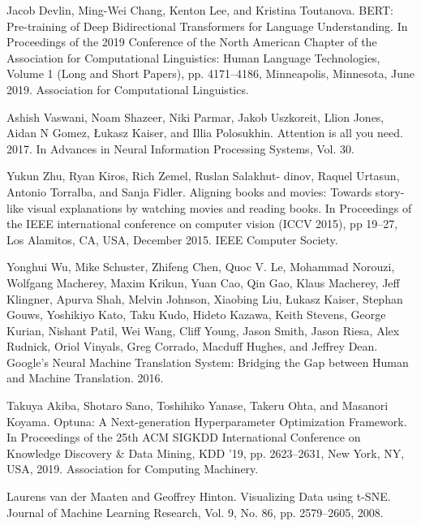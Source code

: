 \begin{thebibliography}{99}
Jacob Devlin, Ming-Wei Chang, Kenton Lee, and Kristina Toutanova.
BERT: Pre-training of Deep Bidirectional Transformers for Language Understanding.
In Proceedings of the 2019 Conference of the North American Chapter of the Association for Computational Linguistics: Human Language Technologies, Volume 1 (Long and Short Papers), pp. 4171--4186, Minneapolis, Minnesota, June 2019. Association for Computational Linguistics.


Ashish Vaswani, Noam Shazeer, Niki Parmar, Jakob Uszkoreit, Llion Jones, Aidan N Gomez, \L ukasz Kaiser, and Illia Polosukhin.
Attention is all you need.
2017.
In Advances in Neural Information Processing Systems, Vol. 30.


Yukun Zhu, Ryan Kiros, Rich Zemel, Ruslan Salakhut- dinov, Raquel Urtasun, Antonio Torralba, and Sanja Fidler.
Aligning books and movies: Towards story-like visual explanations by watching movies and reading books. 
In Proceedings of the IEEE international conference on computer vision (ICCV 2015), pp 19--27, Los Alamitos, CA, USA, December 2015. IEEE Computer Society.


Yonghui Wu, Mike Schuster, Zhifeng Chen, Quoc V. Le, Mohammad Norouzi, Wolfgang Macherey, Maxim Krikun, Yuan Cao, Qin Gao, Klaus Macherey, Jeff Klingner, Apurva Shah, Melvin Johnson, Xiaobing Liu, \L ukasz Kaiser, Stephan Gouws, Yoshikiyo Kato, Taku Kudo, Hideto Kazawa, Keith Stevens, George Kurian, Nishant Patil, Wei Wang, Cliff Young, Jason Smith, Jason Riesa, Alex Rudnick, Oriol Vinyals, Greg Corrado, Macduff Hughes, and Jeffrey Dean.
Google's Neural Machine Translation System: Bridging the Gap between Human and Machine Translation.
2016.


Takuya Akiba, Shotaro Sano, Toshihiko Yanase, Takeru Ohta, and Masanori Koyama.
Optuna: A Next-generation Hyperparameter Optimization Framework.
In Proceedings of the 25th ACM SIGKDD International Conference on Knowledge Discovery \& Data Mining, KDD ’19, pp. 2623--2631, New York, NY, USA, 2019. Association for Computing Machinery.


% 
Laurens van der Maaten and Geoffrey Hinton. 
Visualizing Data using t-SNE. 
Journal of Machine Learning Research, Vol. 9, No. 86, pp. 2579--2605, 2008.





\end{thebibliography}


